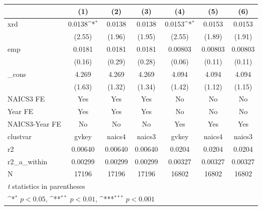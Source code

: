 {
\def\sym#1{\ifmmode^{#1}\else\(^{#1}\)\fi}
\begin{tabular}{l*{6}{c}}
\hline\hline
            &\multicolumn{1}{c}{(1)}         &\multicolumn{1}{c}{(2)}         &\multicolumn{1}{c}{(3)}         &\multicolumn{1}{c}{(4)}         &\multicolumn{1}{c}{(5)}         &\multicolumn{1}{c}{(6)}         \\
\hline
xrd         &      0.0138\sym{*}  &      0.0138         &      0.0138         &      0.0153\sym{*}  &      0.0153         &      0.0153         \\
            &      (2.55)         &      (1.96)         &      (1.95)         &      (2.55)         &      (1.89)         &      (1.91)         \\
[1em]
emp         &      0.0181         &      0.0181         &      0.0181         &     0.00803         &     0.00803         &     0.00803         \\
            &      (0.16)         &      (0.29)         &      (0.28)         &      (0.06)         &      (0.11)         &      (0.11)         \\
[1em]
\_cons      &       4.269         &       4.269         &       4.269         &       4.094         &       4.094         &       4.094         \\
            &      (1.63)         &      (1.32)         &      (1.34)         &      (1.42)         &      (1.12)         &      (1.15)         \\
[1em]
NAICS3 FE   &         Yes         &         Yes         &         Yes         &          No         &          No         &          No         \\
[1em]
Year FE     &         Yes         &         Yes         &         Yes         &          No         &          No         &          No         \\
[1em]
NAICS3-Year FE&          No         &          No         &          No         &         Yes         &         Yes         &         Yes         \\
\hline
clustvar    &       gvkey         &      naics4         &      naics3         &       gvkey         &      naics4         &      naics3         \\
r2          &     0.00640         &     0.00640         &     0.00640         &      0.0204         &      0.0204         &      0.0204         \\
r2\_a\_within &     0.00299         &     0.00299         &     0.00299         &     0.00327         &     0.00327         &     0.00327         \\
N           &       17196         &       17196         &       17196         &       16802         &       16802         &       16802         \\
\hline\hline
\multicolumn{7}{l}{\footnotesize \textit{t} statistics in parentheses}\\
\multicolumn{7}{l}{\footnotesize \sym{*} \(p<0.05\), \sym{**} \(p<0.01\), \sym{***} \(p<0.001\)}\\
\end{tabular}
}
